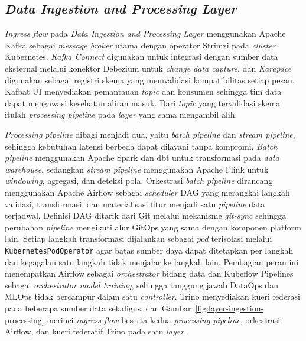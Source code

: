 \subsection{\textit{Data Ingestion and Processing Layer}}
\label{subsec:lapisan-data}

\textit{Ingress flow} pada \textit{Data Ingestion and Processing Layer} menggunakan Apache Kafka \autocite{apachekafka2024} sebagai \textit{message broker} utama dengan operator Strimzi pada \textit{cluster} Kubernetes. \textit{Kafka Connect} digunakan untuk integrasi dengan sumber data eksternal melalui konektor Debezium untuk \textit{change data capture}, dan \textit{Karapace} digunakan sebagai registri skema yang memvalidasi kompatibilitas setiap pesan. Kafbat UI menyediakan pemantauan \textit{topic} dan konsumen sehingga tim data dapat mengawasi kesehatan aliran masuk. Dari \textit{topic} yang tervalidasi skema itulah \textit{processing pipeline} pada \textit{layer} yang sama mengambil alih.

\textit{Processing pipeline} dibagi menjadi dua, yaitu \textit{batch pipeline} dan \textit{stream pipeline}, sehingga kebutuhan latensi berbeda dapat dilayani tanpa kompromi. \textit{Batch pipeline} menggunakan Apache Spark \autocite{apachespark2024} dan dbt untuk transformasi pada \textit{data warehouse}, sedangkan \textit{stream pipeline} menggunakan Apache Flink \autocite{apacheflink2024} untuk \textit{windowing}, agregasi, dan deteksi pola. Orkestrasi \textit{batch pipeline} dirancang menggunakan Apache Airflow \autocite{airflow2024} sebagai \textit{scheduler} DAG yang merangkai langkah validasi, transformasi, dan materialisasi fitur menjadi satu \textit{pipeline} data terjadwal. Definisi DAG ditarik dari Git melalui mekanisme \textit{git-sync} sehingga perubahan \textit{pipeline} mengikuti alur GitOps yang sama dengan komponen platform lain. Setiap langkah transformasi dijalankan sebagai \textit{pod} terisolasi melalui \texttt{KubernetesPodOperator} agar batas sumber daya dapat ditetapkan per langkah dan kegagalan satu langkah tidak menjalar ke langkah lain. Pembagian peran ini menempatkan Airflow sebagai \textit{orchestrator} bidang data dan Kubeflow Pipelines sebagai \textit{orchestrator} \textit{model training}, sehingga tanggung jawab DataOps dan MLOps tidak bercampur dalam satu \textit{controller}. Trino \autocite{trino2024} menyediakan kueri federasi pada beberapa sumber data sekaligus, dan Gambar~\ref{fig:layer-ingestion-processing} merinci \textit{ingress flow} beserta kedua \textit{processing pipeline}, orkestrasi Airflow, dan kueri federatif Trino pada satu \textit{layer}.

